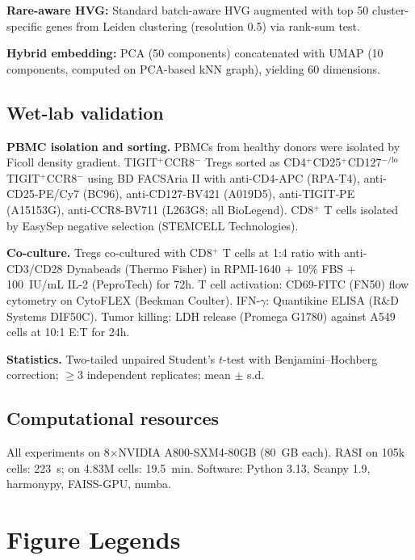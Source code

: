 \documentclass[10pt]{article}
\begin{document}
\textbf{Rare-aware HVG:} Standard batch-aware HVG augmented with top 50 cluster-specific genes from Leiden clustering (resolution 0.5) via rank-sum test.

\textbf{Hybrid embedding:} PCA (50 components) concatenated with UMAP (10 components, computed on PCA-based kNN graph), yielding 60 dimensions.

\subsection*{Wet-lab validation}

\textbf{PBMC isolation and sorting.} PBMCs from healthy donors were isolated by Ficoll density gradient. TIGIT$^+$CCR8$^-$ Tregs sorted as CD4$^+$CD25$^+$CD127$^{-/\text{lo}}$TIGIT$^+$CCR8$^-$ using BD FACSAria II with anti-CD4-APC (RPA-T4), anti-CD25-PE/Cy7 (BC96), anti-CD127-BV421 (A019D5), anti-TIGIT-PE (A15153G), anti-CCR8-BV711 (L263G8; all BioLegend). CD8$^+$ T cells isolated by EasySep negative selection (STEMCELL Technologies).

\textbf{Co-culture.} Tregs co-cultured with CD8$^+$ T cells at 1:4 ratio with anti-CD3/CD28 Dynabeads (Thermo Fisher) in RPMI-1640 + 10\% FBS + 100~IU/mL IL-2 (PeproTech) for 72h. T cell activation: CD69-FITC (FN50) flow cytometry on CytoFLEX (Beckman Coulter). IFN-$\gamma$: Quantikine ELISA (R\&D Systems DIF50C). Tumor killing: LDH release (Promega G1780) against A549 cells at 10:1 E:T for 24h.

\textbf{Statistics.} Two-tailed unpaired Student's $t$-test with Benjamini--Hochberg correction; $\geq$3 independent replicates; mean $\pm$ s.d.

\subsection*{Computational resources}
All experiments on 8$\times$NVIDIA A800-SXM4-80GB (80~GB each). RASI on 105k cells: 223~s; on 4.83M cells: 19.5~min. Software: Python 3.13, Scanpy 1.9, harmonypy, FAISS-GPU, numba.

\section*{Figure Legends}
\end{document}
